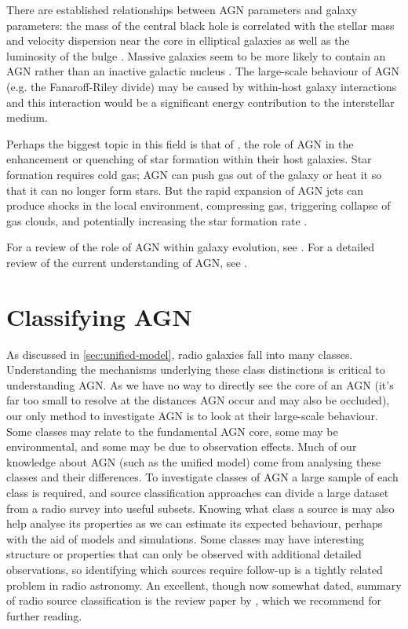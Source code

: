         There are established relationships between AGN parameters and galaxy parameters: the mass of the central black hole is correlated with the stellar mass and velocity dispersion near the core in elliptical galaxies \citep{cattaneo_role_2009} as well as the luminosity of the bulge \citep{kormendy_inward_1995}. Massive galaxies seem to be more likely to contain an AGN rather than an inactive galactic nucleus \citep{hardcastle20feedback}. The large-scale behaviour of AGN (e.g. the Fanaroff-Riley divide) may be caused by within-host galaxy interactions \citep{hardcastle20feedback} and this interaction would be a significant energy contribution to the interstellar medium.

        Perhaps the biggest topic in this field is that of , the role of AGN in the enhancement or quenching of star formation within their host galaxies. Star formation requires cold gas; AGN can push gas out of the galaxy \citep{zubovas_clearing_2012} or heat it so that it can no longer form stars. But the rapid expansion of AGN jets can produce shocks in the local environment, compressing gas, triggering collapse of gas clouds, and potentially increasing the star formation rate \citep{zubovas_collapse_2014}.

        For a review of the role of AGN within galaxy evolution, see \citet{kormendy_coevolution_2013}. For a detailed review of the current understanding of AGN, see \citet{hardcastle20feedback}.

\section{Classifying AGN}
\label{sec:classification-of-agn}

    As discussed in \autoref{sec:unified-model}, radio galaxies fall into many classes. Understanding the mechanisms underlying these class distinctions is critical to understanding AGN. As we have no way to directly see the core of an AGN (it's far too small to resolve at the distances AGN occur and may also be occluded), our only method to investigate AGN is to look at their large-scale behaviour. Some classes may relate to the fundamental AGN core, some may be environmental, and some may be due to observation effects. Much of our knowledge about AGN (such as the unified model) come from analysing these classes and their differences. To investigate classes of AGN a large sample of each class is required, and source classification approaches can divide a large dataset from a radio survey into useful subsets. Knowing what class a source is may also help analyse its properties as we can estimate its expected behaviour, perhaps with the aid of models and simulations. Some classes may have interesting structure or properties that can only be observed with additional detailed observations, so identifying which sources require follow-up is a tightly related problem in radio astronomy. An excellent, though now somewhat dated, summary of radio source classification is the review paper by \citet{urry_unified_1995}, which we recommend for further reading.

